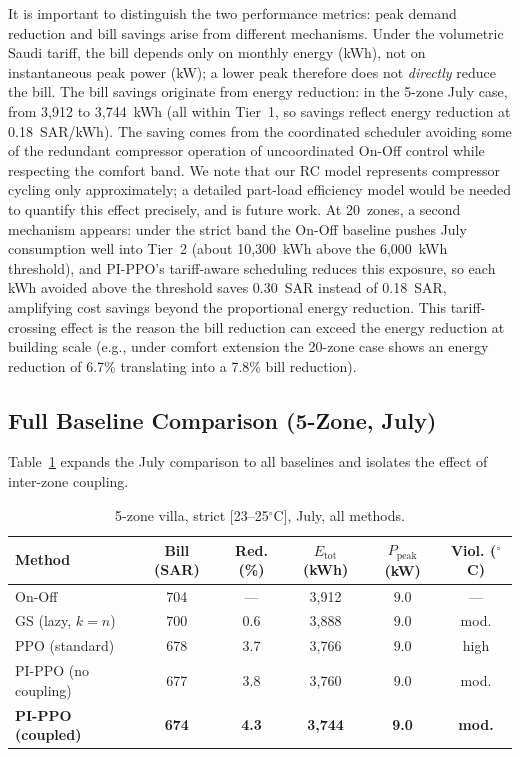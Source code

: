 \documentclass[12pt,a4paper]{article}
\begin{document}
It is important to distinguish the two performance metrics: peak demand reduction and bill savings arise from different mechanisms. Under the volumetric Saudi tariff, the bill depends only on monthly energy (kWh), not on instantaneous peak power (kW); a lower peak therefore does not \textit{directly} reduce the bill. The bill savings originate from energy reduction: in the 5-zone July case, from 3{,}912 to 3{,}744~kWh (all within Tier~1, so savings reflect energy reduction at 0.18~SAR/kWh). The saving comes from the coordinated scheduler avoiding some of the redundant compressor operation of uncoordinated On-Off control while respecting the comfort band. We note that our RC model represents compressor cycling only approximately; a detailed part-load efficiency model would be needed to quantify this effect precisely, and is future work. At 20~zones, a second mechanism appears: under the strict band the On-Off baseline pushes July consumption well into Tier~2 (about 10{,}300~kWh above the 6{,}000~kWh threshold), and PI-PPO's tariff-aware scheduling reduces this exposure, so each kWh avoided above the threshold saves 0.30~SAR instead of 0.18~SAR, amplifying cost savings beyond the proportional energy reduction. This tariff-crossing effect is the reason the bill reduction can exceed the energy reduction at building scale (e.g., under comfort extension the 20-zone case shows an energy reduction of 6.7\% translating into a 7.8\% bill reduction).

\subsection{Full Baseline Comparison (5-Zone, July)}

Table~\ref{tab:july} expands the July comparison to all baselines and isolates the effect of inter-zone coupling.

\begin{table}[H]
\centering
\caption{5-zone villa, strict [23--25$^\circ$C], July, all methods.}
\label{tab:july}
\begin{tabular*}{\textwidth}{@{\extracolsep{\fill}}lccccc@{}}
\toprule
\textbf{Method} & \textbf{Bill} (SAR) & \textbf{Red.} (\%) & $E_{\text{tot}}$ (kWh) & $P_{\text{peak}}$ (kW) & \textbf{Viol.} ($^\circ$C) \\
\midrule
On-Off & 704 & ---  & 3{,}912 & 9.0 & --- \\
GS (lazy, $k=n$) & 700 & 0.6 & 3{,}888 & 9.0 & mod. \\
PPO (standard) & 678 & 3.7 & 3{,}766 & 9.0 & high \\
PI-PPO (no coupling) & 677 & 3.8 & 3{,}760 & 9.0 & mod. \\
\textbf{PI-PPO (coupled)} & \textbf{674} & \textbf{4.3} & \textbf{3{,}744} & \textbf{9.0} & \textbf{mod.} \\
\bottomrule
\end{tabular*}
\end{table}
\end{document}
